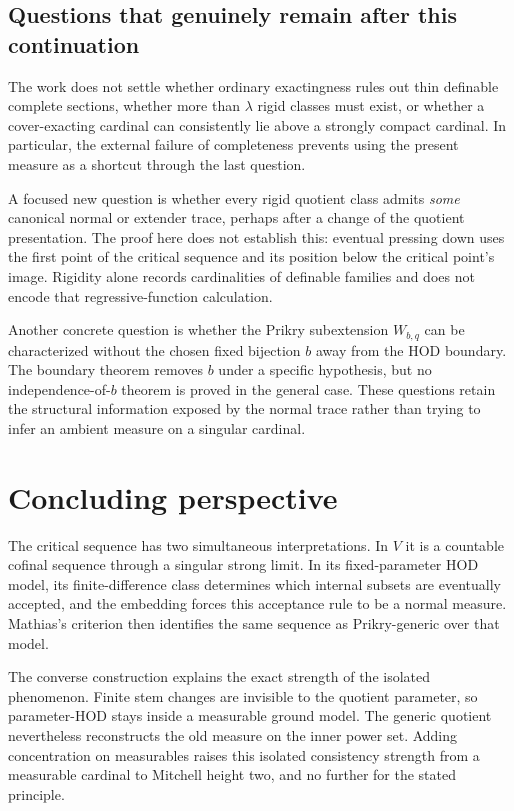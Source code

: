 \documentclass[11pt,letterpaper]{article}
\theoremstyle{definition}
\numberwithin{equation}{section}
\begin{document}
\subsection{Questions that genuinely remain after this continuation}

The work does not settle whether ordinary exactingness rules out thin
definable complete sections, whether more than $\lambda$ rigid classes
must exist, or whether a cover-exacting cardinal can consistently lie
above a strongly compact cardinal. In particular, the external failure
of completeness prevents using the present measure as a shortcut
through the last question.

A focused new question is whether every rigid quotient class admits
\emph{some} canonical normal or extender trace, perhaps after a
change of the quotient presentation. The proof here does not establish
this: eventual pressing down uses the first point of the critical
sequence and its position below the critical point's image. Rigidity
alone records cardinalities of definable families and does not encode
that regressive-function calculation.

Another concrete question is whether the Prikry subextension
$W_{b,q}$ can be characterized without the chosen fixed bijection $b$
away from the HOD boundary. The boundary theorem removes $b$ under a
specific hypothesis, but no independence-of-$b$ theorem is proved in
the general case. These questions retain the structural information
exposed by the normal trace rather than trying to infer an ambient
measure on a singular cardinal.

\newpage
\section{Concluding perspective}

The critical sequence has two simultaneous interpretations. In $V$ it
is a countable cofinal sequence through a singular strong limit. In
its fixed-parameter HOD model, its finite-difference class determines
which internal subsets are eventually accepted, and the embedding
forces this acceptance rule to be a normal measure. Mathias's criterion
then identifies the same sequence as Prikry-generic over that model.

The converse construction explains the exact strength of the isolated
phenomenon. Finite stem changes are invisible to the quotient
parameter, so parameter-HOD stays inside a measurable ground model.
The generic quotient nevertheless reconstructs the old measure on the
inner power set. Adding concentration on measurables raises this
isolated consistency strength from a measurable cardinal to Mitchell
height two, and no further for the stated principle.
\end{document}
